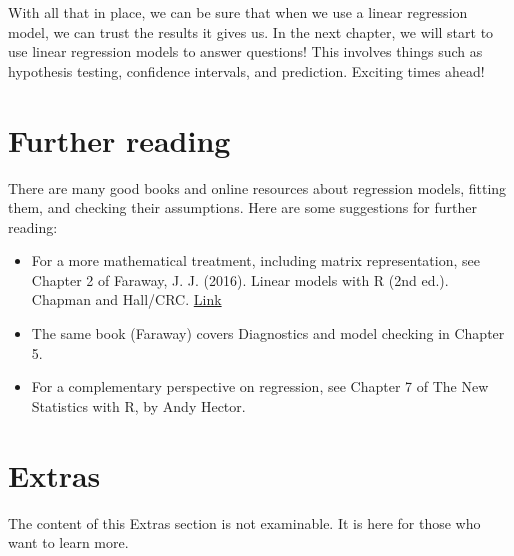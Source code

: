 \documentclass[
  letterpaper,
  8pt,
  a4paper]{book}
\providecommand{\tightlist}{%
  \setlength{\itemsep}{0pt}\setlength{\parskip}{0pt}}
\begin{document}
With all that in place, we can be sure that when we use a linear
regression model, we can trust the results it gives us. In the next
chapter, we will start to use linear regression models to answer
questions! This involves things such as hypothesis testing, confidence
intervals, and prediction. Exciting times ahead!

\section*{Further reading}\label{further-reading-1}


There are many good books and online resources about regression models,
fitting them, and checking their assumptions. Here are some suggestions
for further reading:

\begin{itemize}
\tightlist
\item
  For a more mathematical treatment, including matrix representation,
  see Chapter 2 of Faraway, J. J. (2016). Linear models with R (2nd
  ed.). Chapman and Hall/CRC.
  \href{https://www.routledge.com/Linear-Models-with-R-2nd-Edition/Faraway/p/book/9781482215754}{Link}
\item
  The same book (Faraway) covers Diagnostics and model checking in
  Chapter 5.
\item
  For a complementary perspective on regression, see Chapter 7 of The
  New Statistics with R, by Andy Hector.
\end{itemize}

\section*{Extras}\label{extras-1}


\begin{tcolorbox}[enhanced jigsaw, arc=.35mm, bottomrule=.15mm, bottomtitle=1mm, breakable, colback=white, colbacktitle=quarto-callout-note-color!10!white, colframe=quarto-callout-note-color-frame, coltitle=black, left=2mm, leftrule=.75mm, opacityback=0, opacitybacktitle=0.6, rightrule=.15mm, title=\textcolor{quarto-callout-note-color}{\faInfo}\hspace{0.5em}{Note}, titlerule=0mm, toprule=.15mm, toptitle=1mm]

The content of this Extras section is not examinable. It is here for
those who want to learn more.

\end{tcolorbox}
\end{document}
